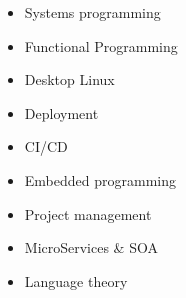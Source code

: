 \documentclass[a4paper]{report}
\begin{document}
\begin{multicols}{3}
    \centering
    \begin{itemize}[leftmargin=2em, topsep=-.5em, parsep=0em]
        \item Systems programming
        \item Functional Programming
        \item Desktop Linux
        \item Deployment
        \item CI/CD
        \item Embedded programming
        \item Project management
        \item MicroServices \& SOA
        \item Language theory
    \end{itemize}
\end{multicols}

\newcommand{\p}[1]{\textbf{#1}\mbox{}\newline}
\def\n{\\\\}
\end{document}
